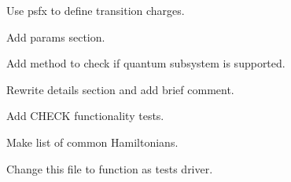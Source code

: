 \begin{DoxyRefList}
\begin{DoxyItemize}
\item Use psfx to define transition charges.
\item Add params section.  
\end{DoxyItemize}
\item[\label{todo__todo000008}%
\hypertarget{todo__todo000008}{}%
Subprogram \hyperlink{classspectrometer__class_ad2c4936524c8702e1c4e53a54a043f31}{spectrometer\+\_\+class\+:\+:get\+\_\+abspectrum} (this, qs, cs, cp, tol, samples, file)]
\begin{DoxyItemize}
\item Add method to check if quantum subsystem is supported.
\item Rewrite details section and add brief comment.  
\end{DoxyItemize}
\item[\label{todo__todo000011}%
\hypertarget{todo__todo000011}{}%
Subprogram \hyperlink{test_hamiltonian_8f90_a131efdec5fd638e337d1a19cdbc85ec6}{testhamiltonian} ]Add C\+H\+E\+C\+K functionality tests.  
\item[\label{todo__todo000012}%
\hypertarget{todo__todo000012}{}%
Subprogram \hyperlink{testobv_8f90_ac6d6842c5f45e3cf3c1a12c74d3ddbd4}{testobv} ]Make list of common Hamiltonians.  
\item[\label{todo__todo000013}%
\hypertarget{todo__todo000013}{}%
Subprogram \hyperlink{tests_8f90_a67a3eef8ad6160d1c0dfac157d5fcfd0}{tests} ]Change this file to function as tests driver. 
\end{DoxyRefList}